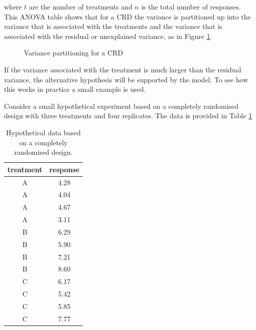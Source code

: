\documentclass[a4paper, 10pt, fleqn, twosided]{memoir}
\begin{document}
where $t$ are the number of treatments and $n$ is the total number of responses. This ANOVA table shows that for a CRD
the variance is partitioned up into the variance that is associated with the treatments and the variance that is
associated with the residual or unexplained variance, as in Figure \ref{fig:crdbucket}.

\begin{figure}[!hbtp]
\centering
{}
\caption{Variance partitioning for a CRD}
\label{fig:crdbucket}
\end{figure}

If the variance associated with the treatment is much larger than the residual variance, the alternative hypothesis
will be supported by the model. To see how this works in practice a small example is used.

Consider a small hypothetical experiment based on a completely randomised design with three treatments and four
replicates. The data is provided in Table \ref{tab:hypcrd}

\begin{table}[ht]
\centering
\begin{tabular}{cc}
 \toprule
  treatment & response \\
  \midrule
  A & 4.28 \\
  A & 4.04 \\
  A & 4.67 \\
  A & 3.11 \\
  B & 6.29 \\
  B & 5.90 \\
  B & 7.21 \\
  B & 8.60 \\
  C & 6.17 \\
   C & 5.42 \\
   C & 5.85 \\
   C & 7.77 \\
   \bottomrule
\end{tabular}
\caption{\label{tab:hypcrd} Hypothetical data based on a completely randomised design.}
\end{table}
\end{document}
